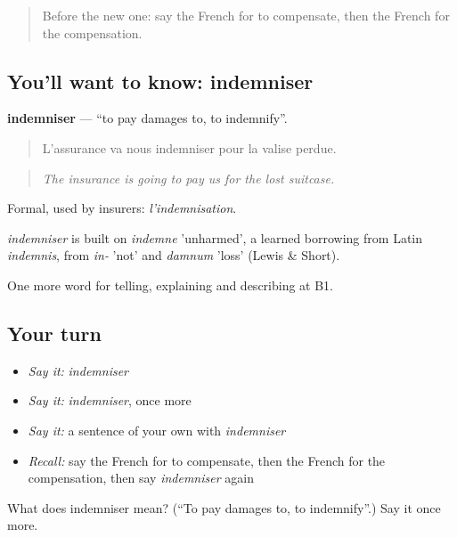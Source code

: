 \label{lesson:FR-C433-indemniser}



\begin{quote}
Before the new one: say the French for to compensate, then the French for the compensation.
\end{quote}

\subsection*{You'll want to know: indemniser}
\textbf{indemniser} — \textquotedblleft{}to pay damages to, to indemnify\textquotedblright{}.

\begin{quote}
L'assurance va nous indemniser pour la valise perdue.
\end{quote}

\begin{quote}
\emph{The insurance is going to pay us for the lost suitcase.}
\end{quote}

Formal, used by insurers: \emph{l'indemnisation}.

\begin{cousinweb}
\emph{indemniser} is built on \emph{indemne} 'unharmed', a learned borrowing from Latin \emph{indemnis}, from \emph{in-} 'not' and \emph{damnum} 'loss' (Lewis \& Short).
\end{cousinweb}

\begin{grammarlens}[title={What you've built}]
One more word for telling, explaining and describing at B1.
\end{grammarlens}

\subsection*{Your turn}
\begin{itemize}
\raggedright
  \item \emph{Say it:} \emph{indemniser}
  \item \emph{Say it:} \emph{indemniser}, once more
  \item \emph{Say it:} a sentence of your own with \emph{indemniser}
  \item \emph{Recall:} say the French for to compensate, then the French for the compensation, then say \emph{indemniser} again
\end{itemize}

\begin{tcolorbox}[breakable,colback=teal!4,colframe=teal!35!black,title={Before you move on}]
What does indemniser mean? (\textquotedblleft{}To pay damages to, to indemnify\textquotedblright{}.) Say it once more.
\end{tcolorbox}
